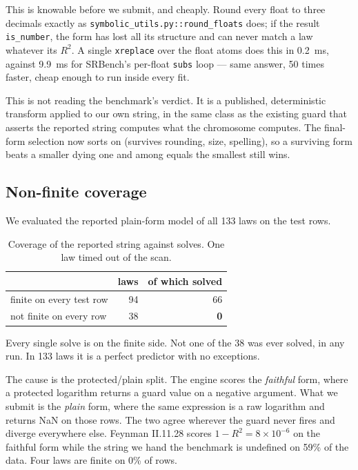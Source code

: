 \documentclass[11pt,a4paper]{article}
\begin{document}
This is knowable before we submit, and cheaply. Round every float to three
decimals exactly as \texttt{symbolic\_utils.py::round\_floats} does; if the
result \texttt{is\_number}, the form has lost all its structure and can never
match a law whatever its $R^2$. A single \texttt{xreplace} over the float atoms
does this in 0.2~ms, against 9.9~ms for SRBench's per-float \texttt{subs} loop
--- same answer, 50 times faster, cheap enough to run inside every fit.

This is not reading the benchmark's verdict. It is a published, deterministic
transform applied to our own string, in the same class as the existing guard
that asserts the reported string computes what the chromosome computes. The
final-form selection now sorts on (survives rounding, size, spelling), so a
surviving form beats a smaller dying one and among equals the smallest still
wins.

\subsection{Non-finite coverage}

We evaluated the reported plain-form model of all 133 laws on the test rows.

\begin{table}[htbp]
\centering
\begin{tabular}{lrr}
\toprule
 & laws & of which solved \\
\midrule
finite on every test row & 94 & 66 \\
not finite on every row & 38 & \textbf{0} \\
\bottomrule
\end{tabular}
\caption{Coverage of the reported string against solves. One law timed out of
the scan.}
\label{tab:finite}
\end{table}

Every single solve is on the finite side. Not one of the 38 was ever solved, in
any run. In 133 laws it is a perfect predictor with no exceptions.

The cause is the protected/plain split. The engine scores the \emph{faithful}
form, where a protected logarithm returns a guard value on a negative argument.
What we submit is the \emph{plain} form, where the same expression is a raw
logarithm and returns NaN on those rows. The two agree wherever the guard never
fires and diverge everywhere else. Feynman II.11.28 scores $1 - R^2 =
8\times10^{-6}$ on the faithful form while the string we hand the benchmark is
undefined on 59\% of the data. Four laws are finite on 0\% of rows.
\end{document}
